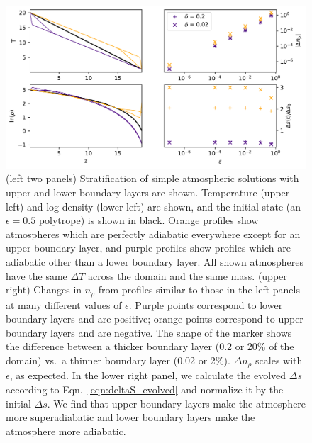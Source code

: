 \begin{figure}[t!]
\includegraphics[width=\textwidth]{./figs/revisions/limiting_adiabats.pdf}
\caption[Theoretical limits on evolved adiabats in polytropic convection.]{ 
		  (left two panels) Stratification of simple atmospheric solutions with upper and lower boundary layers are shown.
		  Temperature (upper left) and log density (lower left) are shown, and the initial state (an $\epsilon = 0.5$ polytrope) is shown in black.
		  Orange profiles show atmospheres which are perfectly adiabatic everywhere except for an upper boundary layer, and purple profiles show profiles which are adiabatic other than a lower boundary layer.
		  All shown atmospheres have the same $\Delta T$ across the domain and the same mass.
		  (upper right) Changes in $n_\rho$ from profiles similar to those in the left panels at many different values of $\epsilon$.
		  Purple points correspond to lower boundary layers and are positive; orange points correspond to upper boundary layers and are negative.
		  The shape of the marker shows the difference between a thicker boundary layer (0.2 or 20\% of the domain) vs.~a thinner boundary layer (0.02 or 2\%).
		  $\Delta n_\rho$ scales with $\epsilon$, as expected.
		  In the lower right panel, we calculate the evolved $\Delta s$ according to Eqn.~\ref{eqn:deltaS_evolved} and normalize it by the initial $\Delta s$.
		  We find that upper boundary layers make the atmosphere more superadiabatic and lower boundary layers make the atmosphere more adiabatic.
	\label{fig:limiting_adiabats} }
\end{figure}




